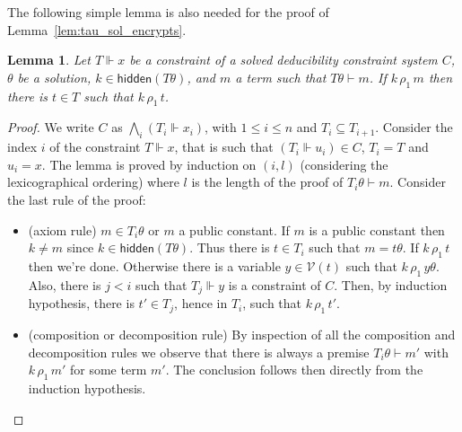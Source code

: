 \documentclass[acmtocl,acmnow]{acmtrans2m}
\newtheorem{lemma}[theorem]{Lemma}
\newcommand{\var}{\mathcal{V}}
\newcommand{\rhoun}{\,\rho_1\,}
\newcommand{\hidden}[1]{\mathsf{hidden}({#1})}
\newcommand{\dedsys}[1]{deducibility constraint system}
\begin{document}
The following simple lemma is also needed for the proof of Lemma~\ref{lem:tau_sol_encrypts}.
\begin{lemma}\label{lem:rho}
Let $T\Vdash x$ be a constraint of a solved \dedsys{} $C$, $\theta$ be a
solution, $k\in\hidden{T\theta}$, and $m$ a term such that $T\theta\vdash m$.
If $k\rhoun m$ then there is $t\in T$ such that $k\rhoun t$.
\end{lemma}
\begin{proof}
We write $C$ as $\bigwedge_i(T_i\Vdash x_i)$, with $1\le i\le n$ and $T_i\subseteq T_{i+1}$.
Consider the index $i$ of the constraint $T\Vdash x$, that is such that $(T_i\Vdash u_i)\in C$, $T_i=T$ and $u_i=x$. The lemma is proved by induction on $(i,l)$ (considering the lexicographical ordering)
where $l$ is the length of the proof of $T_i\theta\vdash m$. Consider the last rule of the proof:
\begin{itemize}
 \item (axiom rule) $m\in T_i\theta$ or $m$ a public constant. If $m$ is a public constant then $k\neq m$ since $k\in\hidden{T\theta}$. Thus there is $t\in T_i$ such that $m=t\theta$. If $k\rhoun t$ then we're done. Otherwise there is a variable $y\in\var(t)$ such that $k\rhoun y\theta$. Also, there is $j<i$ such that $T_j\Vdash y$ is a constraint of $C$. Then, by induction hypothesis, there is $t'\in T_j$, hence in $T_i$, such that $k\rhoun t'$.

 \item (composition or decomposition rule) By inspection of all the composition and decomposition rules we observe that there is always a premise $T_i\theta\vdash m'$ with $k\rhoun m'$ for some term $m'$. The conclusion follows then directly from the induction hypothesis.
\end{itemize}
\end{proof}
\end{document}
